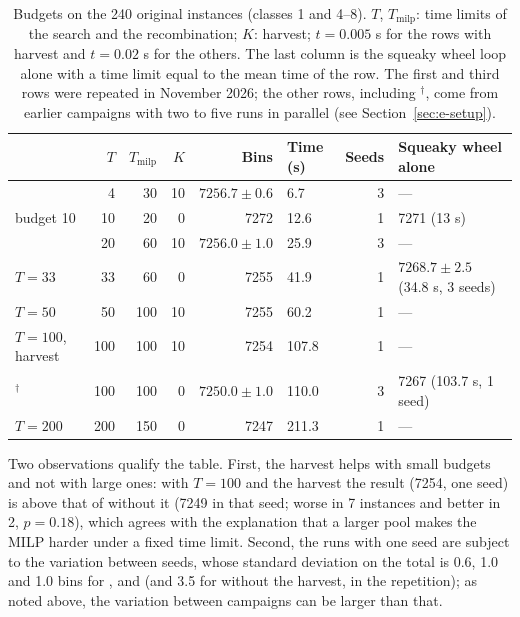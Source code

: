 \begin{table}[t]
\centering
\small\setlength{\tabcolsep}{3pt}
\caption{Budgets on the 240 original instances (classes 1 and 4--8). $T$, $T_{\mathrm{milp}}$: time limits of the search and
the recombination; $K$: harvest; $t=0.005$ s for the rows with harvest and $t=0.02$ s for the others. The last column is the squeaky wheel
loop alone with a time limit equal to the mean time of the row. The first and third rows were repeated in November 2026; the other
rows, including $^\dagger$, come from earlier campaigns with two to five runs in parallel (see Section~\ref{sec:e-setup}).}
\label{tab:e-budget}
\begin{tabular}{@{}lrrrrlrl@{}}
\toprule
 & $T$ & $T_{\mathrm{milp}}$ & $K$ & Bins & Time (s) & Seeds & Squeaky wheel alone\\
\midrule
\cfgfast{} & 4 & 30 & 10 & $7256.7\pm 0.6$ & 6.7 & 3 & ---\\
budget 10 & 10 & 20 & 0 & 7272 & 12.6 & 1 & 7271 (13 s)\\
\cfgbal{} & 20 & 60 & 10 & $7256.0\pm 1.0$ & 25.9 & 3 & ---\\
$T=33$ & 33 & 60 & 0 & 7255 & 41.9 & 1 & $7268.7\pm 2.5$ (34.8 s, 3 seeds)\\
$T=50$ & 50 & 100 & 10 & 7255 & 60.2 & 1 & ---\\
$T=100$, harvest & 100 & 100 & 10 & 7254 & 107.8 & 1 & ---\\
\cfgqual{}$^\dagger$ & 100 & 100 & 0 & $7250.0\pm 1.0$ & 110.0 & 3 & 7267 (103.7 s, 1 seed)\\
$T=200$ & 200 & 150 & 0 & 7247 & 211.3 & 1 & ---\\
\bottomrule
\end{tabular}
\end{table}

Two observations qualify the table. First, the harvest helps with small budgets and not with large ones: with
$T=100$ and the harvest the result (7254, one seed) is above that of \cfgqual{} without it (7249 in that seed; worse in 7
instances and better in 2, $p=0.18$), which agrees with the explanation that a larger pool makes the MILP harder under a fixed time
limit. Second, the runs with one seed are subject to the variation between seeds, whose standard
deviation on the total is 0.6, 1.0 and 1.0 bins for \cfgfast{}, \cfgbal{} and \cfgqual{} (and 3.5 for \cfgfast{} without the harvest, in the repetition); as noted above, the variation
between campaigns can be larger than that.


